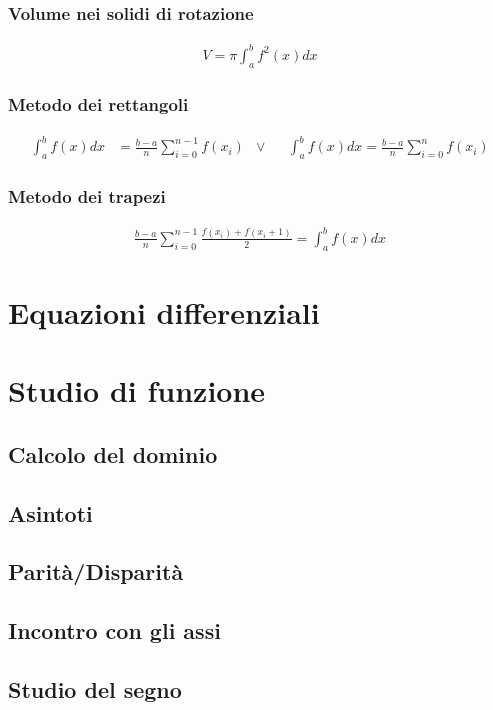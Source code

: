 \documentclass[a4paper]{article}
\begin{document}
	\subsubsection*{Volume nei solidi di rotazione}
	\begin{align*}
		V =\pi \int_{a}^{b} f^2(x)dx
	\end{align*}
	
	\subsubsection*{Metodo dei rettangoli}
	\begin{align*}
		\int_{a}^{b}f(x)dx &= \frac{b-a}{n}\sum_{i=0}^{n-1}f(x_i)		&\vee&	&	\int_{a}^{b} f(x)dx =\frac{b-a}{n}\sum_{i=0}^{n} f(x_i)		
	\end{align*}
	
	\subsubsection*{Metodo dei trapezi}
	\begin{align*}
		\frac{b-a}{n}\sum_{i=0}^{n-1}\frac{f(x_i)+f(x_i + 1)}{2} = \int_{a}^{b} f(x)dx
	\end{align*}
	\newpage
	\section{Equazioni differenziali}
	\newpage
	\section{Studio di funzione}
		
		\subsection{Calcolo del dominio}
		\subsection{Asintoti}
		\subsection{Parità/Disparità}
		\subsection{Incontro con gli assi}
		\subsection{Studio del segno}
\end{document}
